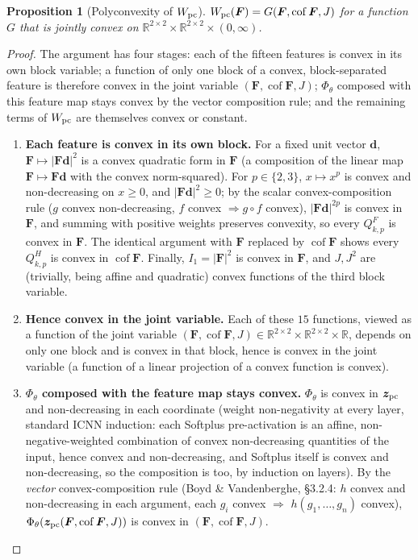 \documentclass[10pt,a4paper]{article}
\newtheorem{proposition}{Proposition}
\newcommand{\Cof}{\operatorname{cof}}
\newcommand{\R}{\mathbb{R}}
\begin{document}
\begin{proposition}[Polyconvexity of $W_{\rm pc}$]
\label{prop:polyconvex}
$W_{\rm pc}(\bm F)=G(\bm F,\Cof \bm F,J)$ for a function $G$ that is jointly convex
on $\R^{2\times2}\times\R^{2\times2}\times(0,\infty)$.
\end{proposition}
\begin{proof}
The argument has four stages: each of the fifteen features is convex in
its own block variable; a function of only one block of a convex,
block-separated feature is therefore convex in the joint variable
$(\bm F,\Cof\bm F,J)$; $\Phi_\theta$ composed with this feature map stays
convex by the vector composition rule; and the remaining terms of
$W_{\rm pc}$ are themselves convex or constant.
\begin{enumerate}
\item \textbf{Each feature is convex in its own block.} For a fixed unit
vector $\bm d$, $\bm F\mapsto|\bm F\bm d|^2$ is a convex quadratic form in
$\bm F$ (a composition of the linear map $\bm F\mapsto \bm F\bm d$ with the
convex norm-squared). For $p\in\{2,3\}$, $x\mapsto x^p$ is convex and
non-decreasing on $x\geq0$, and $|\bm F\bm d|^2\geq0$; by the scalar
convex-composition rule ($g$ convex non-decreasing, $f$ convex
$\Rightarrow g\circ f$ convex), $|\bm F\bm d|^{2p}$ is convex in $\bm F$, and
summing with positive weights preserves convexity, so every $Q_{k,p}^F$
is convex in $\bm F$. The identical argument with $\bm F$ replaced by
$\Cof \bm F$ shows every $Q_{k,p}^H$ is convex in $\Cof \bm F$. Finally,
$I_1=|\bm F|^2$ is convex in $\bm F$, and $J,J^2$ are (trivially, being
affine and quadratic) convex functions of the third block variable.

\item \textbf{Hence convex in the joint variable.} Each of these $15$
functions, viewed as a function of the joint variable
$(\bm F,\Cof \bm F,J)\in\R^{2\times2}\times\R^{2\times2}\times\R$, depends
on only one block and is convex in that block, hence is convex in the
joint variable (a function of a linear projection of a convex function
is convex).

\item \textbf{$\Phi_\theta$ composed with the feature map stays
convex.} $\Phi_\theta$ is convex in $\bm z_{\rm pc}$ and non-decreasing
in each coordinate (weight non-negativity at every layer, standard ICNN
induction: each Softplus pre-activation is an affine,
non-negative-weighted combination of convex non-decreasing quantities of
the input, hence convex and non-decreasing, and Softplus itself is
convex and non-decreasing, so the composition is too, by induction on
layers). By the \emph{vector} convex-composition rule (Boyd \&
Vandenberghe, \S3.2.4: $h$ convex and non-decreasing in each argument,
each $g_i$ convex $\Rightarrow$ $h(g_1,\dots,g_n)$ convex),
$\Phi_\theta(\bm z_{\rm pc}(\bm F,\Cof \bm F,J))$ is convex in
$(\bm F,\Cof \bm F,J)$.


\end{enumerate}
\end{proof}
\end{document}
